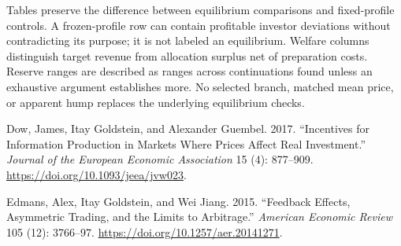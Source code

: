 \documentclass[
  11pt,
]{article}
\newlength{\cslhangindent}
\newenvironment{CSLReferences}[2] %
 {\begin{list}{}{%
  \setlength{\itemindent}{0pt}
  \setlength{\leftmargin}{0pt}
  \setlength{\parsep}{0pt}
  \ifodd #1
   \setlength{\leftmargin}{\cslhangindent}
   \setlength{\itemindent}{-1\cslhangindent}
  \fi
  \setlength{\itemsep}{#2\baselineskip}}}
 {\end{list}}
\begin{document}
Tables preserve the difference between equilibrium comparisons and
fixed-profile controls. A frozen-profile row can contain profitable
investor deviations without contradicting its purpose; it is not labeled
an equilibrium. Welfare columns distinguish target revenue from
allocation surplus net of preparation costs. Reserve ranges are
described as ranges across continuations found unless an exhaustive
argument establishes more. No selected branch, matched mean price, or
apparent hump replaces the underlying equilibrium checks.

\protect{}\label{refs}
\begin{CSLReferences}{1}{1}
Dow, James, Itay Goldstein, and Alexander Guembel. 2017. {``Incentives
for Information Production in Markets Where Prices Affect Real
Investment.''} \emph{Journal of the European Economic Association} 15
(4): 877--909. \url{https://doi.org/10.1093/jeea/jvw023}.

Edmans, Alex, Itay Goldstein, and Wei Jiang. 2015. {``Feedback Effects,
Asymmetric Trading, and the Limits to Arbitrage.''} \emph{American
Economic Review} 105 (12): 3766--97.
\url{https://doi.org/10.1257/aer.20141271}.

\end{CSLReferences}
\end{document}
